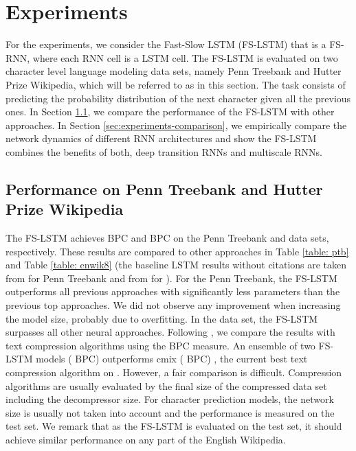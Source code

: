 \documentclass{article}
\begin{document}
 
\section{Experiments} \label{sec:Experiments}
For the experiments, we consider the Fast-Slow LSTM (FS-LSTM) that is a FS-RNN, where each RNN cell is a LSTM cell. The FS-LSTM is evaluated on two character level language modeling data sets, namely Penn Treebank and  Hutter Prize Wikipedia, which will be referred to as  in this section. The task consists of predicting the probability distribution of the next character given all the previous ones. In Section \ref{sec:experiments-state-of-the-art}, we compare the performance of the FS-LSTM with other approaches. In Section \ref{sec:experiments-comparison}, we empirically compare the network dynamics of different RNN architectures and show the FS-LSTM combines the benefits of both, deep transition RNNs and multiscale RNNs.


\subsection{Performance on Penn Treebank and Hutter Prize Wikipedia}\label{sec:experiments-state-of-the-art}

The FS-LSTM achieves   BPC and  BPC on the Penn Treebank and  data sets, respectively. These results are compared to other approaches in Table \ref{table: ptb} and Table \ref{table: enwik8} (the baseline LSTM results without citations are taken from \cite{zoph2016NASCell} for Penn Treebank and from \cite{ha2016hyper} for ). For the Penn Treebank, the FS-LSTM outperforms all previous approaches with  significantly less parameters than the previous top approaches. We did not observe any improvement when increasing the model size, probably due to overfitting. In the   data set, the FS-LSTM surpasses all other neural approaches. Following \cite{graves2014neural}, we compare the results with text compression algorithms using the BPC measure. An ensemble of two FS-LSTM models ( BPC) outperforms cmix ( BPC) \cite{cmix}, the current best  text compression algorithm on  \cite{largetextcompressionbenchmark}. However, a fair comparison is difficult. Compression algorithms are usually evaluated by the final size of the compressed data set including the decompressor size. For character prediction models, the network size is usually not taken into account and the performance is measured on the test set. We remark that as the FS-LSTM is evaluated on the test set, it should achieve similar performance on any part of the English Wikipedia.
\end{document}
